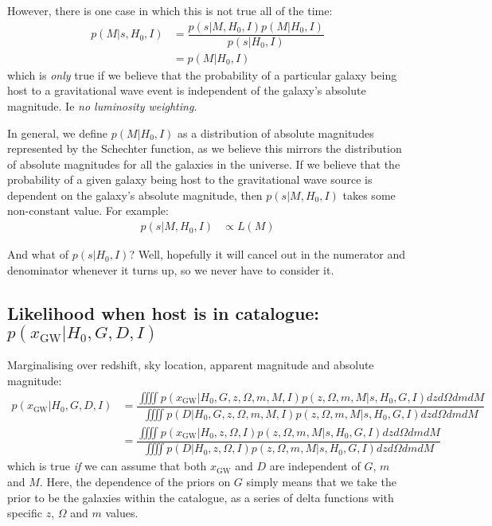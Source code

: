 \documentclass[a4paper,10pt]{article}
\begin{document}
{However, there is one case in which this is not true all of the time:
\begin{equation}
\begin{aligned}
p(M|s,H_0,I) &= \dfrac{p(s|M,H_0,I)p(M|H_0,I)}{p(s|H_0,I)} 
\\ &= p(M|H_0,I)
\end{aligned}
\end{equation}
which is \emph{only} true if we believe that the probability of a particular galaxy being host to a gravitational wave event is independent of the galaxy's absolute magnitude. Ie \emph{no luminosity weighting.}

In general, we define $p(M|H_0,I)$ as a distribution of absolute magnitudes represented by the Schechter function, as we believe this mirrors the distribution of absolute magnitudes for all the galaxies in the universe.  If we believe that the probability of a given galaxy being host to the gravitational wave source is dependent on the galaxy's absolute magnitude, then $p(s|M,H_0,I)$ takes some non-constant value.  For example:
\begin{equation}
\begin{aligned}
p(s|M,H_0,I) &\propto L(M)
\end{aligned}
\end{equation}

And what of $p(s|H_0,I)$?  Well, hopefully it will cancel out in the numerator and denominator whenever it turns up, so we never have to consider it.





\subsection{Likelihood when host is in catalogue: $p(x_{\text{GW}}|H_0,G,D,I)$}


Marginalising over redshift, sky location, apparent magnitude and absolute magnitude:
\begin{equation}
\begin{aligned}
p(x_{\text{GW}}|H_0,G,D,I) &= \dfrac{\iiiint p(x_{\text{GW}}|H_0,G,z,\Omega,m,M,I) p(z,\Omega,m,M|s,H_0,G,I) dz d\Omega dm dM}{\iiiint p(D|H_0,G,z,\Omega,m,M,I) p(z,\Omega,m,M|s,H_0,G,I) dz d\Omega dm dM}
\\ &= \dfrac{\iiiint p(x_{\text{GW}}|H_0,z,\Omega,I) p(z,\Omega,m,M|s,H_0,G,I) dz d\Omega dm dM}{\iiiint p(D|H_0,z,\Omega,I) p(z,\Omega,m,M|s,H_0,G,I) dz d\Omega dm dM}
\end{aligned}
\end{equation}
which is true \emph{if} we can assume that both $x_{\text{GW}}$ and $D$ are independent of $G$, $m$ and $M$.  Here, the dependence of the priors on $G$ simply means that we take the prior to be the galaxies within the catalogue, as a series of delta functions with specific $z$, $\Omega$ and $m$ values.

}
\end{document}
